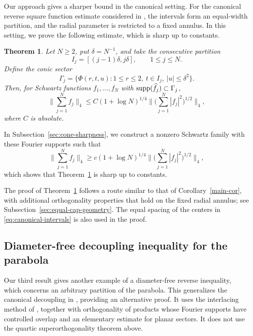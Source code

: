 \documentclass{amsart}
\numberwithin{equation}{section}
\newtheorem{theorem}{Theorem}[section]
\newcommand{\wh}{\widehat}
\newcommand{\supp}{{\rm supp}}
\begin{document}
Our approach gives a sharper bound in the canonical setting.
For the canonical reverse square function estimate considered in \cite{GWZ}, the intervals form an equal-width partition, and the radial parameter is restricted to a fixed annulus.
In this setting, we prove the following estimate, which is sharp up to constants.

\begin{samepage}
\begin{theorem}
\label{thm-cone}
Let $N\geq2$, put $\delta=N^{-1}$, and take the consecutive partition
\begin{equation}
\label{eq:canonical-intervals}
    I_j=[(j-1)\delta,j\delta],\qquad 1\leq j\leq N.
\end{equation}
Define the conic sector
\[
    \Gamma_j=\{\Phi(r,t,u):1\leq r\leq2,\ t\in I_j,
    \ |u|\leq\delta^2\}.
\]
Then, for Schwartz functions $f_1,\ldots,f_N$ with
$\supp(\wh f_j)\subset\Gamma_j$,
\begin{equation}
\label{sq:eq:main}
    \Big\|\sum_{j=1}^N f_j\Big\|_4
    \leq C(1+\log N)^{1/4}
    \Big\|\Big(\sum_{j=1}^N|f_j|^2\Big)^{1/2}\Big\|_4,
\end{equation}
where $C$ is absolute.
\end{theorem}
\end{samepage}

In Subsection~\ref{sec:cone-sharpness}, we construct a nonzero Schwartz family with these Fourier supports such that
\begin{equation}
\nonumber
    \Big\|\sum_{j=1}^N f_j\Big\|_4
    \geq c(1+\log N)^{1/4}
    \Big\|\Big(\sum_{j=1}^N|f_j|^2\Big)^{1/2}\Big\|_4,
\end{equation}
which shows that Theorem~\ref{thm-cone} is sharp up to constants.

The proof of Theorem~\ref{thm-cone} follows a route similar to that of Corollary~\ref{main-cor}, with additional orthogonality properties that hold on the fixed radial annulus; see Subsection~\ref{sec:equal-cap-geometry}. 
The equal spacing of the centers in \eqref{eq:canonical-intervals} is also used in the proof.

\bigskip 

\subsection{Diameter-free decoupling inequality for the parabola}
\label{sec:parabola-statement}


Our third result gives another example of a diameter-free reverse inequality, which concerns an arbitrary partition of the parabola. This generalizes the canonical decoupling in \cite{Bourgain-Demeter}, providing an alternative proof. 
It uses the interlacing method of \cite{Cushman-Demeter-Wu}, together with orthogonality of products whose Fourier supports have controlled overlap and an elementary estimate for planar sectors.
It does not use the quartic superorthogonality theorem above.
\end{document}
